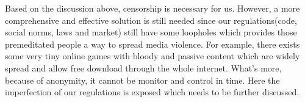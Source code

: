 Based on the discussion above, censorship is necessary for us. However, a more comprehensive and effective solution is still needed since our regulations(code, social norms, laws and market) still have some loopholes which provides those premeditated people a way to spread media violence. For example, there exists some very tiny online games with bloody and passive content which are widely spread and allow free download through the whole internet. What's more, because of anonymity, it cannot be monitor and control in time. Here the imperfection of our regulations is exposed which needs to be further discussed.









